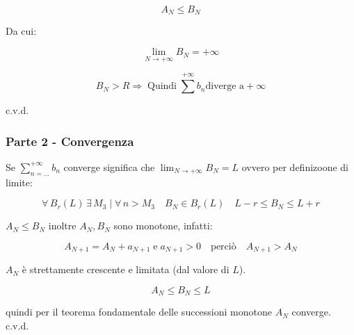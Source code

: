 \documentclass[../dimostrazioni]{subfiles}
\begin{document}
                \[  A_N \leqslant B_N   \]

                Da cui:

                \[  \lim_{N \to +\infty} B_N = +\infty  \]

                \[  B_N > R \Rightarrow \; \text{Quindi} \; \sum^{+\infty} b_n \text{diverge a} +\infty \]

                c.v.d.

            \subsubsection*{Parte 2 - Convergenza}

                Se \(\sum_{n=\dots}^{+\infty} b_n\) converge significa che \(   \lim_{N \to +\infty} B_N = L  \) ovvero per definizoone di limite:

                \[  \forall \, B_r(L)\, \exists \, M_3 \mid \forall \, n>M_3 \quad B_N \in B_r(L) \quad  L-r \leqslant B_N \leqslant L + r   \]
                
                \(A_N \leqslant B_N\) inoltre \(A_N, B_N\) sono monotone, infatti:

                \[  A_{N+1} = A_N + a_{N+1}\; \text{e} \; a_{N+1} > 0 \quad \text{perciò} \quad A_{N+1} > A_N\]

                \(A_N\) è strettamente crescente e limitata (dal valore di \(L\)).

                \[  A_N \leqslant B_N \leqslant L \]

                quindi per il teorema fondamentale delle successioni monotone \(A_N\) converge. c.v.d.
\end{document}
